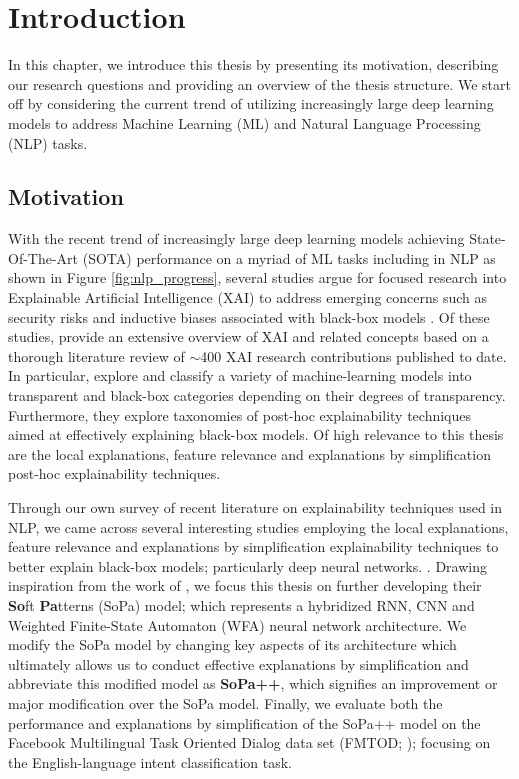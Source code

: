 \chapter{Introduction}

\label{chapter:introduction}

In this chapter, we introduce this thesis by presenting its motivation,
describing our research questions and providing an overview of the thesis
structure. We start off by considering the current trend of utilizing
increasingly large deep learning models to address Machine Learning (ML)
and Natural Language Processing (NLP) tasks.

\section{Motivation}

With the recent trend of increasingly large deep learning models achieving
State-Of-The-Art (SOTA) performance on a myriad of ML tasks including in NLP as
shown in Figure \ref{fig:nlp_progress}, several studies argue for focused
research into Explainable Artificial Intelligence (XAI) to address emerging
concerns such as security risks and inductive biases associated with black-box
models
\citep{doran2017does,townsend2019extracting,danilevsky2020survey,arrieta2020explainable}.
Of these studies, \citet{arrieta2020explainable} provide an extensive overview
of XAI and related concepts based on a thorough literature review of $\sim$400
XAI research contributions published to date. In particular,
\citet{arrieta2020explainable} explore and classify a variety of
machine-learning models into transparent and black-box categories depending on
their degrees of transparency. Furthermore, they explore taxonomies of post-hoc
explainability techniques aimed at effectively explaining black-box models. Of
high relevance to this thesis are the local explanations, feature relevance and
explanations by simplification post-hoc explainability techniques.

Through our own survey of recent literature on explainability techniques used
in NLP, we came across several interesting studies employing the local
explanations, feature relevance and explanations by simplification
explainability techniques to better explain black-box models; particularly
deep neural networks.
\citep{schwartz2018sopa,peng2018rational,suresh-etal-2019-distilling,wang2019state,jiang2020cold}.
Drawing inspiration from the work of \citet{schwartz2018sopa}, we focus this
thesis on further developing their \textbf{So}ft \textbf{Pa}tterns (SoPa) model;
which represents a hybridized RNN, CNN and Weighted Finite-State Automaton (WFA)
neural network architecture. We modify the SoPa model by changing key aspects of
its architecture which ultimately allows us to conduct effective explanations by
simplification and abbreviate this modified model as \textbf{SoPa++}, which
signifies an improvement or major modification over the SoPa model. Finally, we
evaluate both the performance and explanations by simplification of the SoPa++
model on the Facebook Multilingual Task Oriented Dialog data set (FMTOD;
\citealt{schuster-etal-2019-cross-lingual}); focusing on the English-language
intent classification task.

